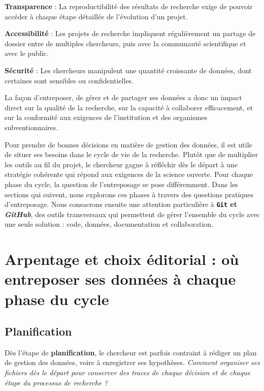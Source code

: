 \documentclass[
  letterpaper,
  DIV=11,
  numbers=noendperiod,
  oneside]{scrreprt}
\begin{document}
\textbf{Transparence} : La reproductibilité des résultats de recherche
exige de pouvoir accéder à chaque étape détaillée de l'évolution d'un
projet.

\textbf{Accessibilité} : Les projets de recherche impliquent
régulièrement un partage de dossier entre de multiples chercheurs, puis
avec la communauté scientifique et avec le public.

\textbf{Sécurité} : Les chercheurs manipulent une quantité croissante de
données, dont certaines sont sensibles ou confidentielles.

La façon d'entreposer, de gérer et de partager ses données a donc un
impact direct sur la qualité de la recherche, sur la capacité à
collaborer efficacement, et sur la conformité aux exigences de
l'institution et des organismes subventionnaires.

Pour prendre de bonnes décisions en matière de gestion des données, il
est utile de situer ses besoins dans le cycle de vie de la recherche.
Plutôt que de multiplier les outils au fil du projet, le chercheur gagne
à réfléchir dès le départ à une stratégie cohérente qui répond aux
exigences de la science ouverte. Pour chaque phase du cycle, la question
de l'entreposage se pose différemment. Dans les sections qui suivent,
nous explorons ces phases à travers des questions pratiques
d'entreposage. Nous consacrons ensuite une attention particulière à
\textbf{\texttt{Git} et \emph{GitHub}}, des outils transversaux qui
permettent de gérer l'ensemble du cycle avec une seule solution : code,
données, documentation et collaboration.

\hypertarget{arpentage-et-choix-uxe9ditorial-ouxf9-entreposer-ses-donnuxe9es-uxe0-chaque-phase-du-cycle}{%
\section{Arpentage et choix éditorial : où entreposer ses données à
chaque phase du
cycle}\label{arpentage-et-choix-uxe9ditorial-ouxf9-entreposer-ses-donnuxe9es-uxe0-chaque-phase-du-cycle}}

\hypertarget{planification}{%
\subsection{Planification}\label{planification}}

Dès l'étape de \textbf{planification}, le chercheur est parfois
contraint à rédiger un plan de gestion des données, voire à enregistrer
ses hypothèses. \emph{Comment organiser ses fichiers dès le départ pour
conserver des traces de chaque décision et de chaque étape du processus
de recherche ?}
\end{document}
